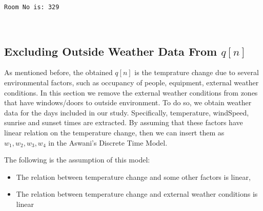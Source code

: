 \documentclass[11pt]{article}
\providecommand{\tightlist}{%
      \setlength{\itemsep}{0pt}\setlength{\parskip}{0pt}}
\begin{document}
    \begin{Verbatim}[commandchars=\\\{\}]
Room No is: 329

    \end{Verbatim}

    \begin{center}
    \end{center}
    { \hspace*{\fill} \\}
    
    \subsection{\texorpdfstring{Excluding Outside Weather Data From
\(q[n]\)}{Excluding Outside Weather Data From q{[}n{]}}}\label{excluding-outside-weather-data-from-qn}

As mentioned before, the obtained \(q[n]\) is the temprature change due
to several environmental factors, such as occupancy of people,
equipment, external weather conditions. In this section we remove the
external weather conditions from zones that have windows/doors to
outside environment. To do so, we obtain weather data for the days
included in our study. Specifically, temperature, windSpeed, sunrise and
sunset times are extracted. By assuming that these factors have linear
relation on the temperature change, then we can insert them as
\(w_1, w_2, w_3, w_4\) in the Aswani's Discrete Time Model.

The following is the assumption of this model:

\begin{itemize}
\tightlist
\item
  The relation between temperature change and some other factors is
  linear,
\item
  The relation between temperature change and external weather
  conditions is linear
\end{itemize}
\end{document}
